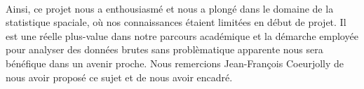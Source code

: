 \documentclass[12pt]{article}
\begin{document}
\\
Ainsi, ce projet nous a enthousiasmé et nous a plongé dans le domaine de la statistique spaciale, où nos connaissances étaient limitées en début de projet. Il est une réelle plus-value dans notre parcours académique et la démarche employée pour analyser des données brutes sans problèmatique apparente nous sera bénéfique dans un avenir proche. Nous remercions Jean-François Coeurjolly de nous avoir proposé ce sujet et de nous avoir encadré.
\newpage
{}

\printbibliography
\end{document}

